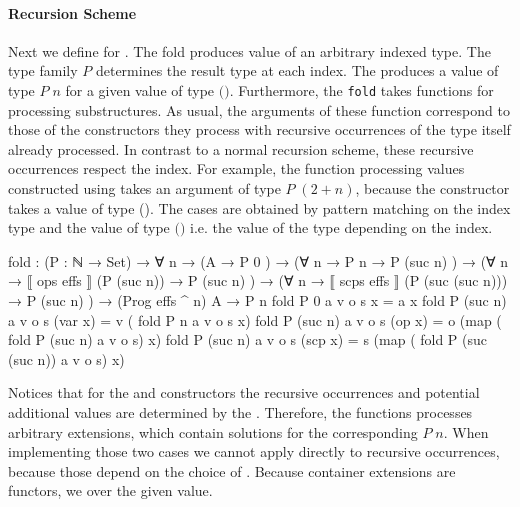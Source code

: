 \paragraph{Recursion Scheme} Next we define  for
\AgdaSpace{}\AgdaSpace{}.
The fold produces value of an arbitrary  indexed type.
The type family $P$ determines the result type at each index.
The  produces a value of type $P\;n$ for a given value of
type
$($\AgdaSpace{}\AgdaSpace{}\AgdaFunction{\textasciicircum}\AgdaSpace{}$)$\AgdaSpace{}.
Furthermore, the \texttt{fold} takes functions for processing substructures.
As usual, the arguments of these function correspond to those of the
constructors they process with recursive occurrences of the type itself already
processed.
In contrast to a normal recursion scheme, these recursive occurrences respect
the index.
For example, the function processing values constructed using
 takes an argument of type $P\;(2 + n)$, because
the constructor takes a value of type 
\AgdaSpace{}\AgdaSpace{}(\AgdaSpace{}\AgdaSpace{}).
The cases are obtained by pattern matching on the index type and the value of
type
$($\AgdaSpace{}\AgdaSpace{}\AgdaFunction{\textasciicircum}\AgdaSpace{}$)$\AgdaSpace{}
i.e. the value of the type depending on the index.

\begin{code}
fold : (P : ℕ → Set) → ∀ n →
  (A                                           → P 0        )  →
  (∀ {n} → P n                                 → P (suc n)  )  →
  (∀ {n} → ⟦ ops   effs  ⟧  (P (suc n))        → P (suc n)  )  →
  (∀ {n} → ⟦ scps  effs  ⟧  (P (suc (suc n)))  → P (suc n)  )  →
  (Prog effs ^ n) A → P n
fold P 0        a v o s x         = a  x
fold P (suc n)  a v o s (var  x)  = v  (       fold P n              a v o s   x)
fold P (suc n)  a v o s (op   x)  = o  (map (  fold P (suc n)        a v o s)  x)
fold P (suc n)  a v o s (scp  x)  = s  (map (  fold P (suc (suc n))  a v o s)  x)
\end{code}
Notices that for the  and
 constructors the recursive occurrences and
potential additional values are determined by the .
Therefore, the functions processes arbitrary  extensions,
which contain solutions for the corresponding $P\;n$.
When implementing those two cases we cannot apply  directly
to recursive occurrences, because those depend on the choice of
.
Because container extensions are functors, we  over the given
value.

